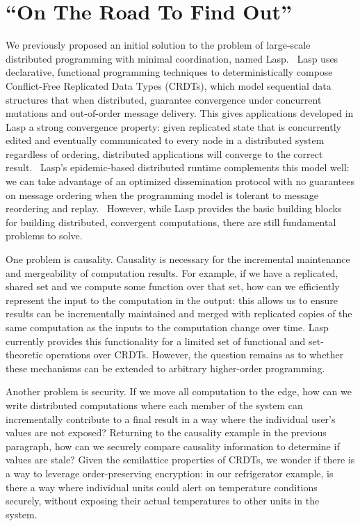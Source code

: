 \documentclass[nocopyrightspace, preprint]{sigplanconf}
\theoremstyle{definition}
\theoremstyle{remark}
\begin{document}
\section{``On The Road To Find Out''}
We previously proposed an initial solution to the problem of large-scale distributed programming with minimal coordination, named Lasp.~\cite{meiklejohn2015lasp} Lasp uses declarative, functional programming techniques to deterministically compose Conflict-Free Replicated Data Types (CRDTs), which model sequential data structures that when distributed, guarantee convergence under concurrent mutations and out-of-order message delivery.  This gives applications developed in Lasp a strong convergence property: given replicated state that is concurrently edited and eventually communicated to every node in a distributed system regardless of ordering, distributed applications will converge to the correct result.~\cite{shapiro2011conflict}  Lasp's epidemic-based distributed runtime complements this model well: we can take advantage of an optimized dissemination protocol with no guarantees on message ordering when the programming model is tolerant to message reordering and replay.~\cite{meiklejohn2015selective}  However, while Lasp provides the basic building blocks for building distributed, convergent computations, there are still fundamental problems to solve.

One problem is causality.  Causality is necessary for the incremental maintenance and mergeability of computation results.  For example, if we have a replicated, shared set and we compute some function over that set, how can we efficiently represent the input to the computation in the output: this allows us to ensure results can be incrementally maintained and merged with replicated copies of the same computation as the inputs to the computation change over time.  Lasp currently provides this functionality for a limited set of functional and set-theoretic operations over CRDTs.  However, the question remains as to whether these mechanisms can be extended to arbitrary higher-order programming.

Another problem is security.  If we move all computation to the edge, how can we write distributed computations where each member of the system can incrementally contribute to a final result in a way where the individual user's values are not exposed?  Returning to the causality example in the previous paragraph, how can we securely compare causality information to determine if values are stale?  Given the semilattice properties of CRDTs, we wonder if there is a way to leverage order-preserving encryption: in our refrigerator example, is there a way where individual units could alert on temperature conditions securely, without exposing their actual temperatures to other units in the system.~\cite{kolesnikov2012limits}
\end{document}
